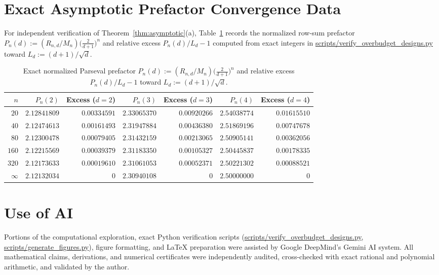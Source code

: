 \documentclass[11pt,reqno]{amsart}
\theoremstyle{definition}
\theoremstyle{remark}
\begin{document}
\appendix

\section{Exact Asymptotic Prefactor Convergence Data}\label{app:asymp}

For independent verification of Theorem~\ref{thm:asymptotic}(a), Table~\ref{tab:app_asymp} records the normalized row-sum prefactor $P_n(d) := (R_{n,d}/M_n)\bigl(\frac{2}{d+1}\bigr)^n$ and relative excess $P_n(d)/L_d - 1$ computed from exact integers in \url{scripts/verify_overbudget_designs.py} toward $L_d := (d+1)/\sqrt{d}$.

\begin{table}[htbp]
\centering
\caption{Exact normalized Parseval prefactor $P_n(d) := (R_{n,d}/M_n)\bigl(\frac{2}{d+1}\bigr)^n$ and relative excess $P_n(d)/L_d - 1$ toward $L_d := (d+1)/\sqrt{d}$.}
\label{tab:app_asymp}
\footnotesize
\begin{tabular}{@{}rrrrrrr@{}}
\toprule
$n$ & $P_n(2)$ & Excess ($d=2$) & $P_n(3)$ & Excess ($d=3$) & $P_n(4)$ & Excess ($d=4$) \\
\midrule
$20$  & $2.12841809$ & $0.00334591$ & $2.33065370$ & $0.00920266$ & $2.54038774$ & $0.01615510$ \\
$40$  & $2.12474613$ & $0.00161493$ & $2.31947884$ & $0.00436380$ & $2.51869196$ & $0.00747678$ \\
$80$  & $2.12300478$ & $0.00079405$ & $2.31432159$ & $0.00213065$ & $2.50905141$ & $0.00362056$ \\
$160$ & $2.12215569$ & $0.00039379$ & $2.31183350$ & $0.00105327$ & $2.50445837$ & $0.00178335$ \\
$320$ & $2.12173633$ & $0.00019610$ & $2.31061053$ & $0.00052371$ & $2.50221302$ & $0.00088521$ \\
\midrule
$\infty$ & $2.12132034$ & $0$ & $2.30940108$ & $0$ & $2.50000000$ & $0$ \\
\bottomrule
\end{tabular}
\end{table}

\section*{Use of AI}
Portions of the computational exploration, exact Python verification scripts (\url{scripts/verify_overbudget_designs.py}, \url{scripts/generate_figures.py}), figure formatting, and LaTeX preparation were assisted by Google DeepMind's Gemini AI system. All mathematical claims, derivations, and numerical certificates were independently audited, cross-checked with exact rational and polynomial arithmetic, and validated by the author.



\end{document}
